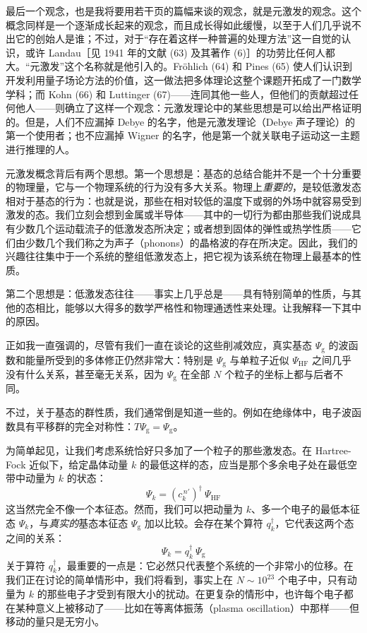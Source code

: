 最后一个观念，也是我将要用若干页的篇幅来谈的观念，就是元激发的观念。这个概念同样是一个逐渐成长起来的观念，而且成长得如此缓慢，以至于人们几乎说不出它的创始人是谁；不过，对于“存在着这样一种普遍的处理方法”这一自觉的认识，或许 Landau［见 1941 年的文献 (63) 及其著作 (6)］的功劳比任何人都大。“元激发”这个名称就是他引入的。Fröhlich (64) 和 Pines (65) 使人们认识到开发利用量子场论方法的价值，这一做法把多体理论这整个课题开拓成了一门数学学科；而 Kohn (66) 和 Luttinger (67)——连同其他一些人，但他们的贡献超过任何他人——则确立了这样一个观念：元激发理论中的某些思想是可以给出严格证明的。但是，人们不应漏掉 Debye 的名字，他是元激发理论（Debye 声子理论）的第一个使用者；也不应漏掉 Wigner 的名字，他是第一个就关联电子运动这一主题进行推理的人。

元激发概念背后有两个思想。第一个思想是：基态的总结合能并不是一个十分重要的物理量，它与一个物理系统的行为没有多大关系。物理上\emph{重要的}，是较低激发态相对于基态的行为：也就是说，那些在相对较低的温度下或弱的外场中就容易受到激发的态。我们立刻会想到金属或半导体——其中的一切行为都由那些我们说成具有少数几个运动载流子的低激发态所决定；或者想到固体的弹性或热学性质——它们由少数几个我们称之为声子（phonons）的晶格波的存在所决定。因此，我们的兴趣往往集中于一个系统的整组低激发态上，把它视为该系统在物理上最基本的性质。

第二个思想是：低激发态往往——事实上几乎总是——具有特别简单的性质，与其他的态相比，能够以大得多的数学严格性和物理通透性来处理。让我解释一下其中的原因。

正如我一直强调的，尽管有我们一直在谈论的这些削减效应，真实基态 $\Psi_{\mathrm{g}}$ 的波函数和能量所受到的多体修正仍然非常大：特别是 $\Psi_{\mathrm{g}}$ 与单粒子近似 $\Psi_{\mathrm{HF}}$ 之间几乎没有什么关系，甚至毫无关系，因为 $\Psi_{\mathrm{g}}$ 在全部 $N$ 个粒子的坐标上都与后者不同。

不过，关于基态的群性质，我们通常倒是知道一些的。例如在绝缘体中，电子波函数具有平移群的完全对称性：$T\Psi_{\mathrm{g}}=\Psi_{\mathrm{g}}$。

为简单起见，让我们考虑系统恰好只多加了一个粒子的那些激发态。在 Hartree-Fock 近似下，给定晶体动量 $k$ 的最低这样的态，应当是那个多余电子处在最低空带中动量为 $k$ 的状态：
\begin{equation*}
\Psi_{k}=\left(c^{\,n'}_{k}\right)^{\dagger}\ \Psi_{\mathrm{HF}}
\end{equation*}
这当然完全不像一个本征态。然而，我们可以把动量为 $k$、多一个电子的最低本征态 $\Psi_{k}$，与\emph{真实的}基态本征态 $\Psi_{\mathrm{g}}$ 加以比较。会存在某个算符 $q^{\dagger}_{k}$，它代表这两个态之间的关系：
\begin{equation*}
\Psi_{k}=q^{\dagger}_{k}\ \Psi_{\mathrm{g}}
\end{equation*}
关于算符 $q^{\dagger}_{k}$，最重要的一点是：它必然只代表整个系统的一个非常小的位移。在我们正在讨论的简单情形中，我们将看到，事实上在 $N\sim 10^{23}$ 个电子中，只有动量为 $k$ 的那些电子才受到有限大小的扰动。在更复杂的情形中，也许每个电子都在某种意义上被移动了——比如在等离体振荡（plasma oscillation）中那样——但移动的量只是无穷小。

